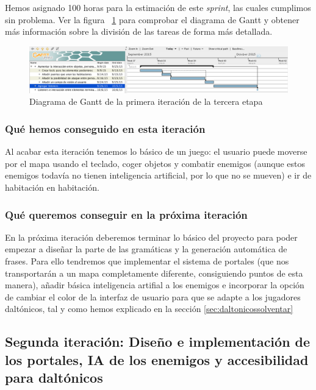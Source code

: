 Hemos asignado 100 horas para la estimación de este \textit{sprint}, las cuales cumplimos sin problema. Ver la figura ~\ref{fig:sec3it1} para comprobar el diagrama de Gantt y obtener más información sobre la división de las tareas de forma más detallada.

\begin{figure}
    \includegraphics[width=\textwidth,height=\textheight,keepaspectratio]{./img/sec3it1.png}
  \caption{Diagrama de Gantt de la primera iteración de la tercera etapa}
  \label{fig:sec3it1}
\end{figure}

\subsubsection{Qué hemos conseguido en esta iteración}

Al acabar esta iteración tenemos lo básico de un juego: el usuario puede moverse por el mapa usando el teclado, coger objetos y combatir enemigos (aunque estos enemigos todavía no tienen inteligencia artificial, por lo que no se mueven) e ir de habitación en habitación.

\subsubsection{Qué queremos conseguir en la próxima iteración}

En la próxima iteración deberemos terminar lo básico del proyecto para poder empezar a diseñar la parte de las gramáticas y la generación automática de frases. Para ello tendremos que implementar el sistema de portales (que nos transportarán a un mapa completamente diferente, consiguiendo puntos de esta manera), añadir básica inteligencia artifial a los enemigos e incorporar la opción de cambiar el color de la interfaz de usuario para que se adapte a los jugadores daltónicos, tal y como hemos explicado en la sección \ref{sec:daltonicossolventar}

\subsection{Segunda iteración: Diseño e implementación de los portales, IA de los enemigos y accesibilidad para daltónicos}

